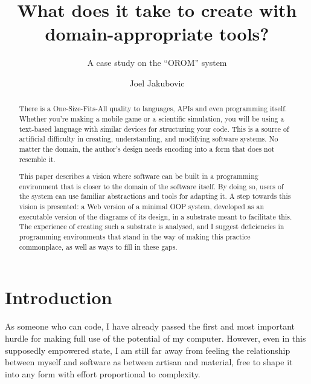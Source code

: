 \title{What does it take to create with domain-appropriate tools?}
\subtitle{A case study on the ``OROM'' system}
\author[ ]{Joel Jakubovic}

\maketitle

\newcommand{\joel}[1]{}
\newcommand{\svgel}[1]{\texttt{\textless{}#1\textgreater{}}}
\newcommand{\OSFA}{One-Size-Fits-All }

\begin{abstract}
There is a One-Size-Fits-All quality to languages, APIs and even programming itself. Whether you're making a mobile game or a scientific simulation, you will be using a text-based language with similar devices for structuring your code. This is a source of artificial difficulty in creating, understanding, and modifying software systems. No matter the domain, the author's design needs encoding into a form that does not resemble it.

This paper describes a vision where software can be built in a programming environment that is closer to the domain of the software itself. By doing so, users of the system can use familiar abstractions and tools for adapting it. A step towards this vision is presented: a Web version of a minimal OOP system, developed as an executable version of the diagrams of its design, in a substrate meant to facilitate this. The experience of creating such a substrate is analysed, and I suggest deficiencies in programming environments that stand in the way of making this practice commonplace, as well as ways to fill in these gaps.
\end{abstract}


\hypertarget{introduction}{%
\section{Introduction}\label{introduction}}

As someone who can code, I have already passed the first and most
important hurdle for making full use of the potential of my computer.
However, even in this supposedly empowered state, I am still far away
from feeling the relationship between myself and software as between
artisan and material, free to shape it into any form with effort
proportional to complexity.

